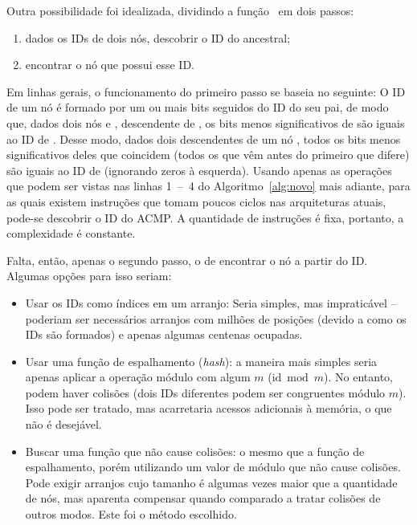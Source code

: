 Outra possibilidade foi idealizada, dividindo a função \ACMPIDs\ em dois passos:
\begin{enumerate}
	\item dados os IDs de dois nós, descobrir o ID do ancestral;
	\item encontrar o nó que possui esse ID.
\end{enumerate}
Em linhas gerais, o funcionamento do primeiro passo se baseia no seguinte:
O ID de um nó é formado por um ou mais bits seguidos do ID do seu pai, de modo que, dados dois nós  e ,  descendente de ,
os bits menos significativos de  são iguais ao ID de .
Desse modo, dados dois descendentes de um nó , todos os bits menos significativos deles que coincidem
(todos os que vêm antes do primeiro que difere) são iguais ao ID de  (ignorando zeros à esquerda).
Usando apenas as operações que podem ser vistas nas linhas 1~--~4 do Algoritmo~\ref{alg:novo} mais adiante,
para as quais existem instruções que tomam poucos ciclos nas arquiteturas atuais, pode-se descobrir o ID do ACMP.
A quantidade de instruções é fixa, portanto, a complexidade é constante.




Falta, então, apenas o segundo passo, o de encontrar o nó a partir do ID.
Algumas opções para isso seriam:
\begin{itemize}
	\item Usar os IDs como índices em um arranjo: Seria simples, mas impraticável -- poderiam ser necessários arranjos com milhões de posições (devido a como os IDs são formados) e apenas algumas centenas ocupadas.
	\item Usar uma função de espalhamento (\textit{hash}): a maneira mais simples seria apenas aplicar a operação módulo com algum $m$ ($\mathrm{id} \bmod m$).
	No entanto, podem haver colisões (dois IDs diferentes podem ser congruentes módulo $m$).
	Isso pode ser tratado, mas acarretaria acessos adicionais à memória, o que não é desejável.
	\item Buscar uma função que não cause colisões: o mesmo que a função de espalhamento, porém utilizando um valor de módulo que não cause colisões.
	Pode exigir arranjos cujo tamanho é algumas vezes maior que a quantidade de nós, mas aparenta compensar quando comparado a tratar colisões de outros modos.
	Este foi o método escolhido.
\end{itemize}


